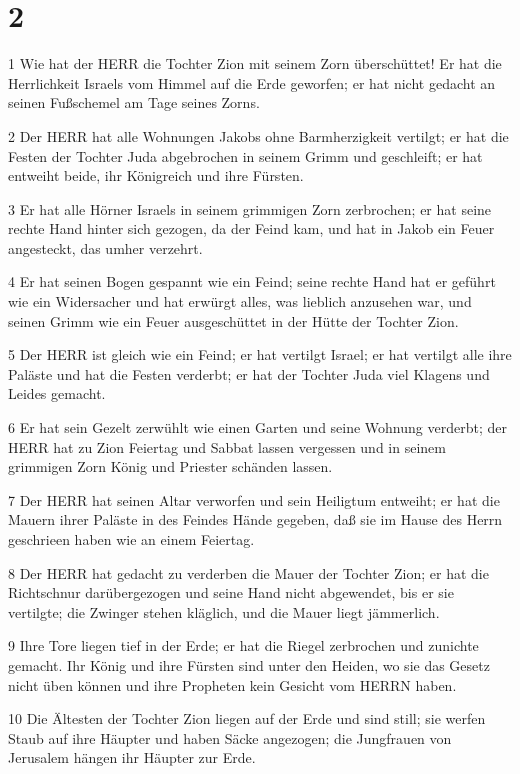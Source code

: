 \chapter{2}

\par 1 Wie hat der HERR die Tochter Zion mit seinem Zorn überschüttet! Er hat die Herrlichkeit Israels vom Himmel auf die Erde geworfen; er hat nicht gedacht an seinen Fußschemel am Tage seines Zorns.
\par 2 Der HERR hat alle Wohnungen Jakobs ohne Barmherzigkeit vertilgt; er hat die Festen der Tochter Juda abgebrochen in seinem Grimm und geschleift; er hat entweiht beide, ihr Königreich und ihre Fürsten.
\par 3 Er hat alle Hörner Israels in seinem grimmigen Zorn zerbrochen; er hat seine rechte Hand hinter sich gezogen, da der Feind kam, und hat in Jakob ein Feuer angesteckt, das umher verzehrt.
\par 4 Er hat seinen Bogen gespannt wie ein Feind; seine rechte Hand hat er geführt wie ein Widersacher und hat erwürgt alles, was lieblich anzusehen war, und seinen Grimm wie ein Feuer ausgeschüttet in der Hütte der Tochter Zion.
\par 5 Der HERR ist gleich wie ein Feind; er hat vertilgt Israel; er hat vertilgt alle ihre Paläste und hat die Festen verderbt; er hat der Tochter Juda viel Klagens und Leides gemacht.
\par 6 Er hat sein Gezelt zerwühlt wie einen Garten und seine Wohnung verderbt; der HERR hat zu Zion Feiertag und Sabbat lassen vergessen und in seinem grimmigen Zorn König und Priester schänden lassen.
\par 7 Der HERR hat seinen Altar verworfen und sein Heiligtum entweiht; er hat die Mauern ihrer Paläste in des Feindes Hände gegeben, daß sie im Hause des Herrn geschrieen haben wie an einem Feiertag.
\par 8 Der HERR hat gedacht zu verderben die Mauer der Tochter Zion; er hat die Richtschnur darübergezogen und seine Hand nicht abgewendet, bis er sie vertilgte; die Zwinger stehen kläglich, und die Mauer liegt jämmerlich.
\par 9 Ihre Tore liegen tief in der Erde; er hat die Riegel zerbrochen und zunichte gemacht. Ihr König und ihre Fürsten sind unter den Heiden, wo sie das Gesetz nicht üben können und ihre Propheten kein Gesicht vom HERRN haben.
\par 10 Die Ältesten der Tochter Zion liegen auf der Erde und sind still; sie werfen Staub auf ihre Häupter und haben Säcke angezogen; die Jungfrauen von Jerusalem hängen ihr Häupter zur Erde.
